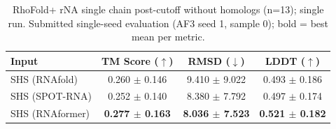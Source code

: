 \begin{table}[htbp]
\centering
\caption{RhoFold+ rNA single chain post-cutoff without homologs (n=13); single run. Submitted single-seed evaluation (AF3 seed 1, sample 0); bold = best mean per metric.}
\label{tab:rf_rna_single_chain_post_cutoff_without_homologs}
\begin{tabular}{lccc}
\toprule
Input & TM Score ($\uparrow$) & RMSD ($\downarrow$) & LDDT ($\uparrow$) \\
\midrule
SHS (RNAfold) & 0.260 $\pm$ 0.146 & 9.410 $\pm$ 9.022 & 0.493 $\pm$ 0.186 \\
SHS (SPOT-RNA) & 0.252 $\pm$ 0.140 & 8.380 $\pm$ 7.792 & 0.497 $\pm$ 0.174 \\
SHS (RNAformer) & \textbf{0.277 $\pm$ 0.163} & \textbf{8.036 $\pm$ 7.523} & \textbf{0.521 $\pm$ 0.182} \\
\bottomrule
\end{tabular}
\end{table}
